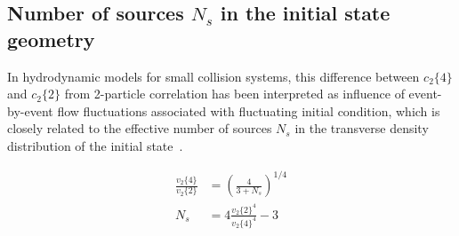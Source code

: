 \subsection{Number of sources $N_{s}$ in the initial state geometry}

In hydrodynamic models for small collision systems, this difference between $c_{2}\{4\}$ and $c_{2}\{2\}$ from 2-particle correlation has been interpreted as influence of event-by-event flow fluctuations associated with fluctuating initial condition, which is closely related to the effective number of sources $N_{s}$ in the transverse density distribution of the initial state~\cite{Bzdak:2013rya, Yan:2013laa}.

\begin{equation}
\begin{split}
\frac{v_{2}\{4\}}{v_{2}\{2\}} &= (\frac{4}{3+N_{s}})^{1/4} \\
N_{s} &= 4\frac{v_{2}\{2\}^{4}}{v_{2}\{4\}^{4}}-3
\end{split}
\end{equation}

